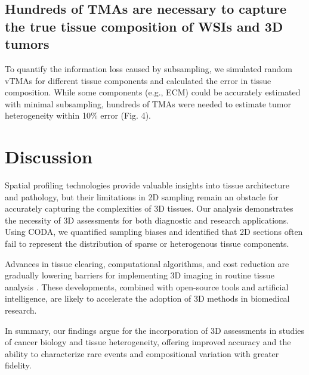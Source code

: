 \begin{refsection}
    \subsection{Hundreds of TMAs are necessary to capture the true tissue composition of WSIs and 3D tumors}
    To quantify the information loss caused by subsampling, we simulated random vTMAs for different tissue components and calculated the error in tissue composition. While some components (e.g., ECM) could be accurately estimated with minimal subsampling, hundreds of TMAs were needed to estimate tumor heterogeneity within 10\% error (Fig. 4).

    \section{Discussion}
    Spatial profiling technologies provide valuable insights into tissue architecture and pathology, but their limitations in 2D sampling remain an obstacle for accurately capturing the complexities of 3D tissues. Our analysis demonstrates the necessity of 3D assessments for both diagnostic and research applications. Using CODA, we quantified sampling biases and identified that 2D sections often fail to represent the distribution of sparse or heterogenous tissue components.

    Advances in tissue clearing, computational algorithms, and cost reduction are gradually lowering barriers for implementing 3D imaging in routine tissue analysis \cite{ref66, ref74}. These developments, combined with open-source tools and artificial intelligence, are likely to accelerate the adoption of 3D methods in biomedical research.

    In summary, our findings argue for the incorporation of 3D assessments in studies of cancer biology and tissue heterogeneity, offering improved accuracy and the ability to characterize rare events and compositional variation with greater fidelity.

    \printbibliography[heading=subbibliography, title={References}]
\end{refsection}